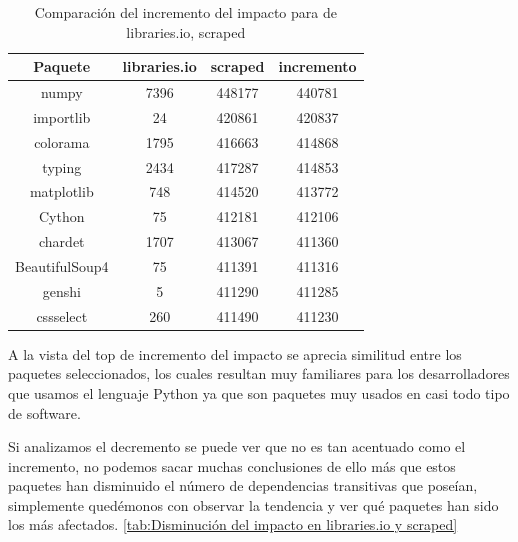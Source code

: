 \begin{table}[h!]
    \centering
    \caption{Comparación del incremento del impacto para de libraries.io, scraped}
    \begin{tabular}{|c|c|c|c|}
        \hline
        \textbf{Paquete} & \textbf{libraries.io} & \textbf{scraped} & \textbf{incremento} \\
        \hline
        numpy            & 7396                  & 448177           & 440781              \\
        importlib        & 24                    & 420861           & 420837              \\
        colorama         & 1795                  & 416663           & 414868              \\
        typing           & 2434                  & 417287           & 414853              \\
        matplotlib       & 748                   & 414520           & 413772              \\
        Cython           & 75                    & 412181           & 412106              \\
        chardet          & 1707                  & 413067           & 411360              \\
        BeautifulSoup4   & 75                    & 411391           & 411316              \\
        genshi           & 5                     & 411290           & 411285              \\
        cssselect        & 260                   & 411490           & 411230              \\
        \hline
    \end{tabular}
\end{table}


A la vista del top de incremento del impacto se aprecia similitud entre los paquetes seleccionados,
los cuales resultan muy familiares para los desarrolladores que usamos el lenguaje Python ya que
son paquetes muy usados en casi todo tipo de software.

Si analizamos el decremento se puede ver que no es tan acentuado como el incremento, no
podemos sacar muchas conclusiones de ello más que estos paquetes han disminuido el número de
dependencias transitivas que poseían, simplemente quedémonos con observar la tendencia y ver qué
paquetes han sido los más afectados. \ref{tab:Disminución del impacto en libraries.io y scraped}

